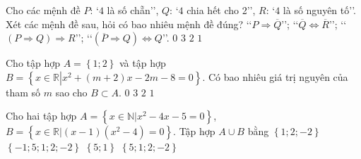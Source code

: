 \begin{ex}
	Cho các mệnh đề $P$: \lq{} $4$ là số chẵn\rq\rq, $Q$: \lq{} $4$ chia hết cho 2\rq\rq, $R$: \lq{} $4$ là số nguyên tố\rq\rq. Xét các mệnh đề sau, hỏi có bao nhiêu mệnh đề đúng?
	\lq\lq$P\Rightarrow \overline{Q}$\rq\rq; \lq\lq$\overline{Q}\Leftrightarrow \overline{R}$\rq\rq; \lq\lq$\left(P\Rightarrow Q\right)\Rightarrow R$\rq\rq; \lq\lq$\left(\overline{P}\Rightarrow Q\right)\Leftrightarrow Q$\rq\rq.
	\choice
	{$0$}
	{$3$}
	{$2$}
	{\True $1$}
\end{ex}
\begin{ex}
	Cho tập hợp $A=\left\{ 1;2 \right\}$ và tập hợp $B=\left\{ x\in \mathbb{R}\left| x^2+(m+2)x-2m-8=0 \right. \right\}$. Có bao nhiêu giá trị nguyên của tham số $m$ sao cho $B\subset A$.
	\choice
	{$0$}
	{$3$}
	{\True $2$}
	{$1$}
\end{ex}
\begin{ex}
	Cho hai tập hợp $A=\left\{ x\in \mathbb{N}|x^2-4x-5=0 \right\}$, $B=\left\{ x\in \mathbb{R}|(x-1)\left(x^2-4\right)=0 \right\}$. Tập hợp $A\cup B$ bằng
	\choice
	{$\left\{ 1;2;-2 \right\}$}
	{$\left\{ -1;5;1;2;-2 \right\}$}
	{$\left\{ 5;1 \right\}$}
	{\True $\left\{ 5;1;2;-2 \right\}$}
\end{ex}
